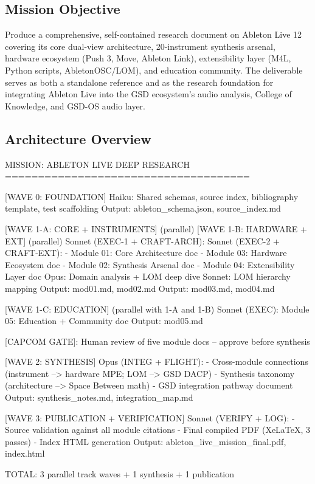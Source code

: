 \documentclass[11pt,letterpaper]{article}
\begin{document}
\subsection{Mission Objective}

Produce a comprehensive, self-contained research document on Ableton Live 12 covering its
core dual-view architecture, 20-instrument synthesis arsenal, hardware ecosystem (Push 3,
Move, Ableton Link), extensibility layer (M4L, Python scripts, AbletonOSC/LOM), and education
community. The deliverable serves as both a standalone reference and as the research foundation
for integrating Ableton Live into the GSD ecosystem's audio analysis, College of Knowledge,
and GSD-OS audio layer.

\subsection{Architecture Overview}

\begin{asciibox}
MISSION: ABLETON LIVE DEEP RESEARCH
=====================================

[WAVE 0: FOUNDATION]
  Haiku: Shared schemas, source index, bibliography template, test scaffolding
  Output: ableton_schema.json, source_index.md

[WAVE 1-A: CORE + INSTRUMENTS] (parallel)          [WAVE 1-B: HARDWARE + EXT] (parallel)
  Sonnet (EXEC-1 + CRAFT-ARCH):                      Sonnet (EXEC-2 + CRAFT-EXT):
    - Module 01: Core Architecture doc                  - Module 03: Hardware Ecosystem doc
    - Module 02: Synthesis Arsenal doc                  - Module 04: Extensibility Layer doc
  Opus: Domain analysis + LOM deep dive              Sonnet: LOM hierarchy mapping
  Output: mod01.md, mod02.md                         Output: mod03.md, mod04.md

[WAVE 1-C: EDUCATION] (parallel with 1-A and 1-B)
  Sonnet (EXEC): Module 05: Education + Community doc
  Output: mod05.md

[CAPCOM GATE]: Human review of five module docs -- approve before synthesis

[WAVE 2: SYNTHESIS]
  Opus (INTEG + FLIGHT):
    - Cross-module connections (instrument --> hardware MPE; LOM --> GSD DACP)
    - Synthesis taxonomy (architecture --> Space Between math)
    - GSD integration pathway document
  Output: synthesis_notes.md, integration_map.md

[WAVE 3: PUBLICATION + VERIFICATION]
  Sonnet (VERIFY + LOG):
    - Source validation against all module citations
    - Final compiled PDF (XeLaTeX, 3 passes)
    - Index HTML generation
  Output: ableton_live_mission_final.pdf, index.html

TOTAL: 3 parallel track waves + 1 synthesis + 1 publication
\end{asciibox}
\end{document}
